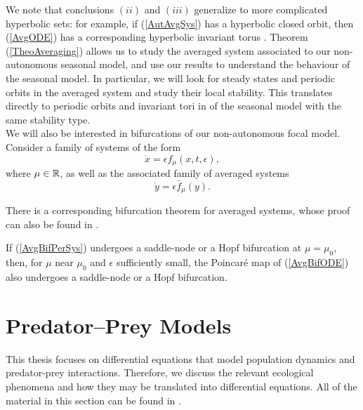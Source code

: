 \documentclass[12pt]{UOthesis}
\theoremstyle{remarkstyle}
\begin{document}
We note that conclusions $(ii)$ and $(iii)$ generalize to more complicated hyperbolic sets: for example, if (\ref{AutAvgSys}) has a hyperbolic closed orbit, then (\ref{AvgODE}) has a corresponding hyperbolic invariant torus \cite{Hale}. Theorem (\ref{TheoAveraging}) allows us to study the averaged system associated to our non-autonomous seasonal model, and use our results to understand the behaviour of the seasonal model. In particular, we will look for steady states and periodic orbits in the averaged system and study their local stability. This translates directly to periodic orbits and invariant tori in of the seasonal model with the same stability type.\\

We will also be interested in bifurcations of our non-autonomous focal model. Consider a family of systems of the form
\begin{equation}
	\dot{x}=\epsilon f_\mu (x,t,\epsilon),
	\label{AvgBifODE}
\end{equation}
where $\mu\in \mathbb R$,  as well as the associated family of averaged systems
\begin{equation}
	\dot{y}=\epsilon \bar{f}_\mu (y).
	\label{AvgBifPerSys}
\end{equation}

There is a corresponding bifurcation theorem for averaged systems, whose proof can also be found in \cite{GuckHolmes}.

\begin{theo}
	If (\ref{AvgBifPerSys}) undergoes a saddle-node or a Hopf bifurcation at $\mu=\mu_0$, then, for $\mu$ near $\mu_0$ and $\epsilon$ sufficiently small, the Poincar\'e map of (\ref{AvgBifODE}) also undergoes a saddle-node or a Hopf bifurcation.
	\label{TheoAvgBif}
\end{theo}

\section{Predator--Prey Models}
\label{SectionPredPreyModels}

This thesis focuses on differential equations that model population dynamics and predator-prey interactions. Therefore, we discuss the relevant ecological phenomena and how they may be translated into differential equations. All of the material in this section can be found in \cite{Kot}.\\
\end{document}
